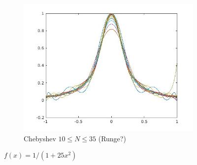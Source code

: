 \documentclass{article}
\begin{document}
\begin{figure}[H]
\begin{subfigure}[b]{0.3\linewidth}
	\includegraphics[width=\linewidth]{f1_cheb_1.jpg}
        \caption{Chebyshev $10 \le N \le 35$ (Runge?)}
    \end{subfigure}
    \caption{$f(x) = 1 / (1 + 25 x^2)$}
\end{figure}
\end{document}

